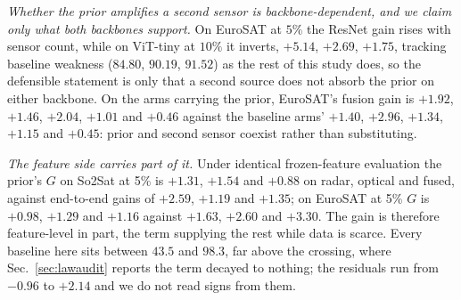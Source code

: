\emph{Whether the prior amplifies a second sensor is backbone-dependent, and we
claim only what both backbones support.} On EuroSAT at $5\%$ the ResNet gain rises
with sensor count, while on ViT-tiny at $10\%$ it inverts, $+5.14$, $+2.69$,
$+1.75$, tracking
baseline weakness ($84.80$, $90.19$, $91.52$) as the rest of this study does,
so the defensible statement is only that a second source does not absorb the
prior on either backbone. On the arms carrying the prior, EuroSAT's fusion gain
is $+1.92$, $+1.46$, $+2.04$, $+1.01$ and $+0.46$ against the baseline arms'
$+1.40$, $+2.96$, $+1.34$, $+1.15$ and $+0.45$: prior and second sensor coexist
rather than substituting.

\emph{The feature side carries part of it.} Under identical frozen-feature
evaluation the prior's $G$ on So2Sat at 5\% is $+1.31$, $+1.54$ and $+0.88$ on
radar, optical and fused, against end-to-end gains of $+2.59$, $+1.19$ and
$+1.35$; on EuroSAT at 5\% $G$ is $+0.98$, $+1.29$ and $+1.16$ against $+1.63$,
$+2.60$ and $+3.30$. The gain is therefore feature-level in part, the \readout{}
term supplying the rest while data is scarce. Every baseline here sits between
$43.5$ and $98.3$, far above the crossing, where
Sec.~\ref{sec:lawaudit} reports the \readout{} term decayed to nothing; the
residuals run from $-0.96$ to $+2.14$ and we do not
read signs from them.

